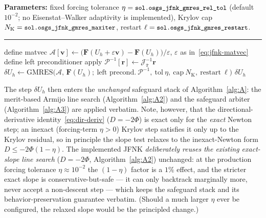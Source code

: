 \documentclass{article}
\newcommand{\code}[1]{\texttt{\small #1}}
\begin{document}
\begin{algorithm}[H]
\caption{$\mathrm{JFNKStep}$ \emph{(implemented; opt-in \code{osgs\_jfnk\_enabled})}: full-tangent Newton step via preconditioned matrix-free GMRES.}
\label{alg:jfnk}
\SetAlgoLined
\textbf{Parameters:} fixed forcing tolerance $\eta = \code{sol.osgs\_jfnk\_gmres\_rel\_tol}$ (default $10^{-2}$; no Eisenstat--Walker adaptivity is implemented), Krylov cap $N_{\mathrm{K}} = \code{sol.osgs\_jfnk\_gmres\_maxiter}$, restart $\ell = \code{sol.osgs\_jfnk\_gmres\_restart}$.\\
\vspace{0.2cm}\hrule\vspace{0.2cm}
define matvec $\mathcal{A}[\boldsymbol{v}] \gets \bigl(\boldsymbol{F}(U_h + \varepsilon\boldsymbol{v}) - \boldsymbol{F}(U_h)\bigr)/\varepsilon$, $\varepsilon$ as in~\eqref{eq:jfnk-matvec} 
define left preconditioner apply $\mathcal{P}^{-1}[\boldsymbol{r}] \gets \mathcal{J}_{\bar\pi}^{-1}\boldsymbol{r}$ 
$\delta U_h \gets \mathrm{GMRES}\bigl(\mathcal{A},\, \boldsymbol{F}(U_h);\ \text{left precond.}\ \mathcal{P}^{-1},\ \text{tol}\ \eta,\ \text{cap}\ N_{\mathrm{K}},\ \text{restart}\ \ell\bigr)$ \;
\Return $\delta U_h$\;
\end{algorithm}

The step $\delta U_h$ then enters the \emph{unchanged} safeguard stack
of Algorithm~\ref{alg:A}: the merit-based Armijo line search
(Algorithm~\ref{alg:A2}) and the safeguard arbiter
(Algorithm~\ref{alg:A3}) are applied verbatim. Note, however, that the
directional-derivative identity~\eqref{eq:dir-deriv} ($D = -2\Phi$) is
exact only for the \emph{exact} Newton step; an inexact (forcing-term
$\eta > 0$) Krylov step satisfies it only up to the Krylov residual, so in
principle the slope test relaxes to the inexact-Newton form
$D \le -2\Phi(1-\eta)$. The implemented JFNK \emph{deliberately reuses the
existing exact-slope line search} ($D = -2\Phi$, Algorithm~\ref{alg:A2})
unchanged: at the production forcing tolerance $\eta \approx 10^{-2}$ the
$(1-\eta)$ factor is a $1\%$ effect, and the stricter exact slope is
conservative-but-safe --- it can only backtrack marginally more, never accept a
non-descent step --- which keeps the safeguard stack and its behavior-preservation
guarantee verbatim. (Should a much larger $\eta$ ever be configured, the relaxed
slope would be the principled change.)
\end{document}
